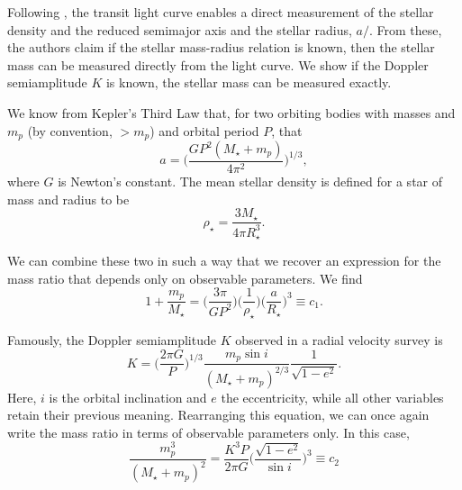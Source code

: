 Following \citet{Seager03}, the transit light curve enables a direct measurement of the stellar density \rhostar{} and the reduced semimajor axis and the stellar radius, $a/$\rstar. 
From these, the authors claim if the stellar mass-radius relation is known, then the stellar mass can be measured directly from the light curve. 
We show if the Doppler semiamplitude $K$ is known, the stellar mass can be measured exactly.

We know from Kepler's Third Law that, for two orbiting bodies with masses \mstar{} and $m_p$ (by convention, \mstar$ > m_p$) and orbital period $P$, that
\begin{equation}
a = \bigg(\frac{GP^2(M_\star+m_p)}{4\pi^2}\bigg)^{1/3},
\end{equation}
where $G$ is Newton's constant.
The mean stellar density is defined for a star of mass \mstar{} and radius \rstar{} to be
\begin{equation}
\rho_\star = \frac{3M_\star}{4 \pi R_\star^3}.
\label{Eq:Density}
\end{equation}

We can combine these two in such a way that we recover an expression for the mass ratio that depends only on observable parameters. We find
\begin{equation}
1 + \frac{m_p}{M_\star} = \bigg(\frac{3\pi}{GP^2}\bigg) \bigg(\frac{1}{\rho_\star}\bigg) \bigg(\frac{a}{R_\star}\bigg)^3 \equiv c_1.
\end{equation}

Famously, the Doppler semiamplitude $K$ observed in a radial velocity survey is 
\begin{equation}
K = \bigg(\frac{2\pi G}{P}\bigg)^{1/3} \frac{m_p \sin{i}}{(M_\star + m_p)^{2/3}}\frac{1}{\sqrt{1-e^2}}.
\end{equation}
Here, $i$ is the orbital inclination and $e$ the eccentricity, while all other variables retain their previous meaning.
Rearranging this equation, we can once again write the mass ratio in terms of observable parameters only. In this case,
\begin{equation}
\frac{m_p^3}{(M_\star + m_p)^2} = \frac{K^3 P}{2\pi G} \bigg(\frac{\sqrt{1-e^2}}{\sin{i}}\bigg)^3 \equiv c_2
\end{equation}

